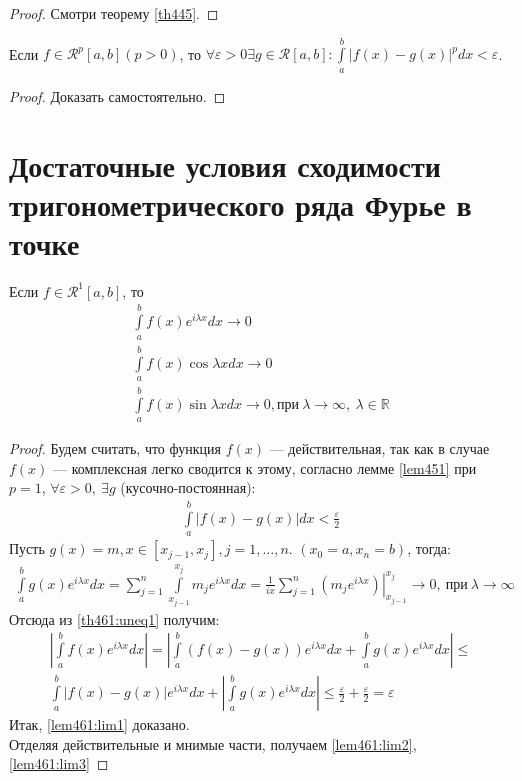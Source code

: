 \begin{proof}
  Смотри теорему \eqref{th445}.
\end{proof}

\begin{lemma}
  \label{lem451}
  Если $f \in \mathcal{R}^p[a,b] (p > 0)$, то $\forall \varepsilon > 0 \exists g \in
  \mathcal{R}[a,b]: \int\limits_a^b |f(x) - g(x)|^p dx < \varepsilon$.
\end{lemma}

\begin{proof}
  Доказать самостоятельно.
\end{proof}

\section{Достаточные условия сходимости тригонометрического ряда Фурье в точке}
\begin{lemma}[Римана]
  Если $f \in \mathcal{R}^1[a,b]$, то
  \begin{gather}
    \int\limits_a^b f(x) e^{i\lambda x} dx \to 0
    \label{lem461:lim1} \\
    \int\limits_a^b f(x) \cos \lambda x dx \to 0
    \label{lem461:lim2} \\
    \int\limits_a^b f(x) \sin \lambda x dx \to 0, \text{при} \ \lambda \to
    \infty, \ \lambda \in \mathbb{R}
    \label{lem461:lim3}
  \end{gather}
\end{lemma}

\begin{proof}
  Будем считать, что функция $f(x)$ --- действительная, так как в случае $f(x)$
  --- комплексная легко сводится к этому, согласно лемме \eqref{lem451} при $p
  = 1$, $\forall \varepsilon > 0, \ \exists g$ (кусочно-постоянная):
  \begin{gather}
    \int\limits_a^b |f(x) - g(x)| dx < \frac{\varepsilon}{2}
    \label{th461:uneq1}
  \end{gather}
  Пусть $g(x) = m, x \in [x_{j-1}, x_j], j = 1, \dots, n$. $(x_0 = a, x_n =
  b)$, тогда:
  \begin{gather*}
    \int\limits_a^b g(x) e^{i\lambda x} dx = \sum\limits_{j = 1}^{n}
    \int\limits_{x_{j-1}}^{x_j} m_j e^{i\lambda x} dx = \left. \frac{1}{ix}
    \sum\limits_{j = 1}^{n} (m_j e^{i \lambda x})
    \right |_{x_{j-1}}^{x_j} \to 0, \ \text{при} \ \lambda \to \infty
  \end{gather*}
  Отсюда из \eqref{th461:uneq1} получим: \\
  \begin{gather*}
    \left| \int\limits_a^b f(x) e^{i\lambda x} dx \right| =
    \left| \int\limits_a^b (f(x) - g(x)) e^{i\lambda x} dx +
    \int\limits_a^b g(x) e^{i\lambda x} dx \right| \leq \\
    \int\limits_a^b |f(x) - g(x)| e^{i\lambda x} dx +
    \left| \int\limits_a^b g(x) e^{i\lambda x} dx \right| \leq
    \frac{\varepsilon}{2} + \frac{\varepsilon}{2} = \varepsilon
  \end{gather*}
  Итак, \eqref{lem461:lim1} доказано. \\
  Отделяя действительные и мнимые части, получаем \eqref{lem461:lim2},
  \eqref{lem461:lim3}
\end{proof}


